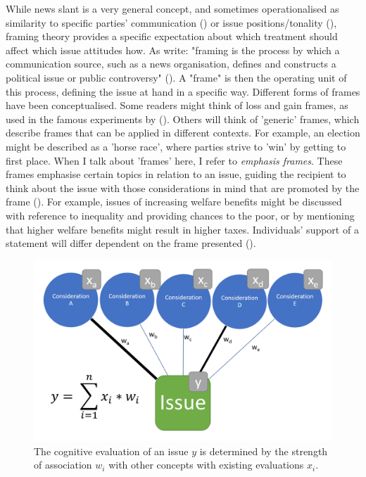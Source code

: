 \documentclass{article}
\begin{document}
While news slant is a very general concept, and sometimes operationalised as similarity to specific parties' communication (\cite{Gentzkow2010}) or issue positions/tonality (\cite{Spirig2020}), framing theory provides a specific expectation about which treatment should affect which issue attitudes how. As \citeauthor{Nelson1997} write: "framing is the process by which a communication source, such as a news organisation, defines and constructs a political issue or public controversy" (\citeyear[567]{Nelson1997}). A "frame" is then the operating unit of this process, defining the issue at hand in a specific way. Different forms of frames have been conceptualised. Some readers might think of loss and gain frames, as used in the famous experiments by \citeauthor{Kahneman1979prospect} (\citeyear{Kahneman1979prospect}). Others will think of ’generic’ frames, which describe frames that can be applied in different contexts. For example, an election might be described as a ’horse race’, where parties strive to ’win’ by getting to ﬁrst place. When I talk about 'frames' here, I refer to \textit{emphasis frames}. These frames emphasise certain topics in relation to an issue, guiding the recipient to think about the issue with those considerations in mind that are promoted by the frame (\cite[153f]{Leeper2020}). For example, issues of increasing welfare benefits might be discussed with reference to inequality and providing chances to the poor, or by mentioning that higher welfare benefits might result in higher taxes. Individuals' support of a statement will differ dependent on the frame presented (\cite{sniderman2004structure}).

\begin{figure}
    \centering
    \includegraphics[width=\textwidth]{paper/vis/CognitiveStorage.png}
    \caption{The cognitive evaluation of an issue $y$ is determined by the strength of association $w_i$ with other concepts with existing evaluations $x_i$.}
    \label{fig:cogStor}
\end{figure}
\end{document}
